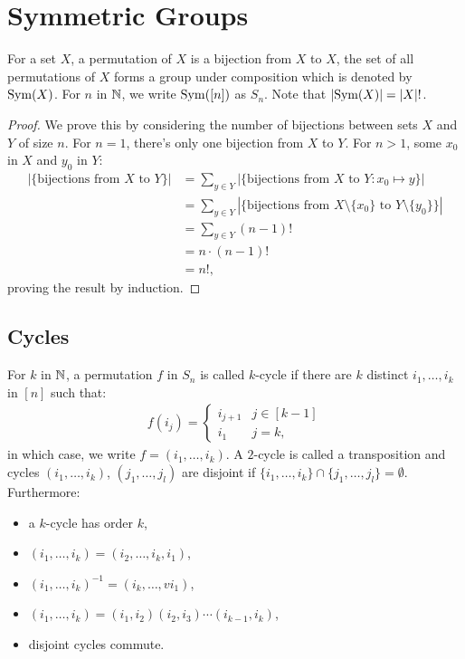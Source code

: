 \section{Symmetric Groups}

For a set $X$, a permutation of $X$ is a bijection from $X$ to $X$,
the set of all permutations of $X$ forms a group under composition
which is denoted by $\operatorname{Sym}(X)$. For $n$ in $\mathbb{N}$, we write $\operatorname{Sym}([n])$ as $S_n$.
Note that $|\!\operatorname{Sym}(X)| = |X|!$.

\begin{proof}
    We prove this by considering the number of bijections between sets
    $X$ and $Y$ of size $n$. For $n = 1$, there's only one bijection
    from $X$ to $Y$. For $n > 1$, some $x_0$ in $X$ and $y_0$ in $Y$: \begin{align*}
        |\{\text{bijections from $X$ to $Y$}\}| 
        &= \sum_{y \in Y} |\{\text{bijections from } X \text{ to } Y 
            : x_0 \mapsto y\}| \\
        &= \sum_{y \in Y} |\{\text{bijections from } X \setminus \{x_0\} 
            \text{ to } Y \setminus \{y_0\}\}| \\
        &= \sum_{y \in Y} (n - 1)! \\
        &= n \cdot (n - 1)! \\
        &= n!,
    \end{align*} proving the result by induction.
\end{proof}

\subsection{Cycles}

For $k$ in $\mathbb{N}$, a permutation $f$ in $S_n$ is called $k$-cycle if
there are $k$ distinct $i_1, \ldots, i_k$ in $[n]$ such that:
\begin{align*}
    f(i_j) = \begin{cases}
        i_{j + 1} & j \in [k - 1] \\
        i_1 & j = k,
    \end{cases}
\end{align*} in which case, we write $f = (i_1, \ldots, i_k)$.
A $2$-cycle is called a transposition and cycles 
$(i_1, \ldots, i_k)$, $(j_1, \ldots, j_l)$
are disjoint if $\{i_1, \ldots, i_k\} \cap \{j_1, \ldots, j_l\} = \emptyset$.
Furthermore: \begin{itemize}
    \item a $k$-cycle has order $k$,
    \item $(i_1, \ldots, i_k) = (i_2, \ldots, i_k, i_1)$,
    \item $(i_1, \ldots, i_k)^{-1} = (i_k, \ldots,v i_1)$,
    \item $(i_1, \ldots, i_k) = (i_1, i_2)(i_2, i_3) \cdots (i_{k - 1}, i_k)$,
    \item disjoint cycles commute.
\end{itemize} 

